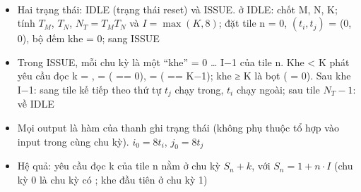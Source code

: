 \documentclass[10pt,a4paper]{article}
\begin{document}
\paragraph{}\label{par:5-4}
\begin{itemize}
\item Hai trạng thái: IDLE (trạng thái reset) và ISSUE.  ở IDLE: chốt M, N, K; tính $T_M$, $T_N$, $N_T = T_M T_N$ và $I = \max(K, 8)$; đặt tile n = 0, $(t_i, t_j)$ = (0, 0), bộ đếm khe  = 0; sang ISSUE
\item Trong ISSUE, mỗi chu kỳ là một “khe”  = 0 … I−1 của tile n. Khe  < K phát yêu cầu đọc k = ,  = ( == 0),  = ( == K−1); khe  ≥ K là bọt ( = 0). Sau khe I−1: sang tile kế tiếp theo thứ tự $t_j$ chạy trong, $t_i$ chạy ngoài; sau tile $N_T - 1$: về IDLE
\item Mọi output là hàm của thanh ghi trạng thái (không phụ thuộc tổ hợp vào input trong cùng chu kỳ). $i_0 = 8 t_i$, $j_0 = 8 t_j$
\item Hệ quả: yêu cầu đọc k của tile n nằm ở chu kỳ $S_n + k$, với $S_n = 1 + n\cdot I$ (chu kỳ 0 là chu kỳ có ; khe đầu tiên ở chu kỳ 1)
\end{itemize}

\subsubsection{\texorpdfstring{}{gemm\_skew}}\label{sec:5.3}
\end{document}
